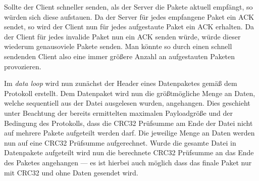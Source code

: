 Sollte der Client schneller senden, als der Server die Pakete aktuell empfängt, so würden sich diese aufstauen.
Da der Server für jedes empfangene Paket ein ACK sendet, so wird der Client nun für jedes aufgestaute Paket ein ACK erhalten.
Da der Client für jedes invalide Paket nun ein ACK senden würde, würde dieser wiederum genausoviele Pakete senden.
Man könnte so durch einen schnell sendenden Client also eine immer größere Anzahl an aufgestauten Paketen provozieren. \newline

Im \textit{data loop} wird nun zunächst der Header eines Datenpaketes gemäß dem Protokoll erstellt.
Dem Datenpaket wird nun die größtmögliche Menge an Daten, welche sequentiell aus der Datei ausgelesen wurden, angehangen.
Dies geschieht unter Beachtung der bereits ermittelten maximalen Payloadgröße und der Bedingung des Protokolls, dass die CRC32 Prüfsumme am Ende der Datei nicht auf mehrere Pakete aufgeteilt werden darf.
Die jeweilige Menge an Daten werden nun auf eine CRC32 Prüfsumme aufgerechnet.
Wurde die gesamte Datei in Datenpakete aufgeteilt wird nun die berechnete CRC32 Prüfsumme an das Ende des Paketes angehangen --- es ist hierbei auch möglich dass das finale Paket nur mit CRC32 und ohne Daten gesendet wird.

